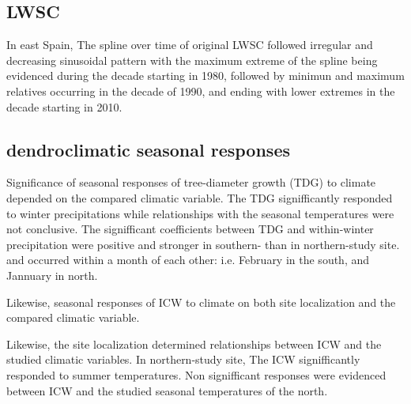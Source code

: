 \documentclass[review,authoryear]{elsarticle}
\begin{document}
\subsection{\acrlong{LWSC}}

In east Spain, The spline over time of original \gls{LWSC} followed
irregular and decreasing sinusoidal pattern with the maximum extreme
of the spline being evidenced during the decade starting in 1980,
followed by minimun and maximum relatives occurring in the decade of
1990, and ending with lower extremes in the decade starting in 2010.

\subsection{dendroclimatic seasonal responses}

Significance of seasonal responses of tree-diameter growth (TDG) to
climate depended on the compared climatic variable. The TDG
signifficantly responded to winter precipitations while relationships
with the seasonal temperatures were not conclusive. The signifficant
coefficients between TDG and within-winter precipitation were positive
and stronger in southern- than in northern-study site. and occurred
within a month of each other: i.e. February in the south, and Jannuary
in north.

Likewise, seasonal responses of ICW to climate on both site
localization and the compared climatic variable.

Likewise, the site localization determined relationships between ICW
and the studied climatic variables. In northern-study site, The ICW
signifficantly responded to summer temperatures. Non signifficant
responses were evidenced between ICW and the studied seasonal
temperatures of the north.






\newpage
\section{\refname}


\end{document}
